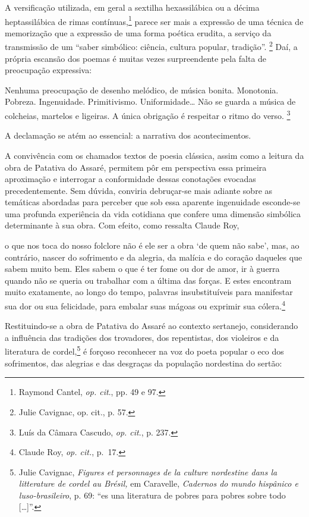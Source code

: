 \noindent A versificação utilizada, em geral a sextilha
hexassilábica ou a décima heptassilábica de rimas contínuas,\footnote{ Raymond
Cantel, \textit{op. cit}., pp. 49 e 97.} parece ser mais a expressão de uma
técnica de memorização que a expressão de uma forma poética erudita, a serviço
da transmissão de um “saber simbólico: ciência, cultura popular, tradição”.
\footnote{ Julie Cavignac, op. cit., p. 57.} Daí, a própria escansão dos
poemas é muitas vezes surpreendente pela falta de preocupação expressiva:

\begin{hedraquote}
Nenhuma preocupação de desenho melódico, de música bonita. Monotonia. Pobreza.
Ingenuidade. Primitivismo. Uniformidade\ldots{} Não se guarda a música de
colcheias, martelos e ligeiras. A única obrigação é respeitar o ritmo do verso.
\footnote{ Luís da Câmara Cascudo, \textit{op. cit}., p. 237.}
\end{hedraquote}

\noindent A declamação se
atém ao essencial: a narrativa dos acontecimentos.

A convivência com os chamados textos de poesia clássica, assim como a leitura da
obra de Patativa do Assaré, permitem pôr em perspectiva essa primeira aproximação
e interrogar a conformidade dessas conotações evocadas precedentemente. Sem
dúvida, conviria debruçar-se mais adiante sobre as temáticas abordadas para
perceber que sob essa aparente ingenuidade esconde-se uma profunda experiência
da vida cotidiana que confere uma dimensão simbólica determinante à sua obra.
Com efeito, como ressalta Claude Roy, 

\begin{hedraquote}
o que nos toca do nosso folclore não é
ele ser a obra ‘de quem não sabe’, mas, ao contrário, nascer do sofrimento e da
alegria, da malícia e do coração daqueles que sabem muito bem. Eles sabem o que
é ter fome ou dor de amor, ir à guerra quando não se queria ou trabalhar com a
última das forças. E estes encontram muito exatamente, ao longo do tempo,
palavras insubstituíveis para manifestar sua dor ou sua felicidade, para embalar
suas mágoas ou exprimir sua cólera.\footnote{ Claude Roy, \textit{op. cit.}, p.~17.}
\end{hedraquote}

\noindent Restituindo-se a obra de Patativa do Assaré ao contexto sertanejo,
considerando a influência das tradições dos trovadores, dos repentistas, dos
violeiros e da literatura de cordel,\footnote{ Julie Cavignac, \textit{Figures et
personnages de la culture nordestine dans la litterature de cordel au
Brésil,} em Caravelle, \textit{Cadernos do mundo hispânico e luso-brasileiro},
p. 69: “es una literatura de pobres para pobres sobre todo [\ldots{}]”.} é
forçoso reconhecer na voz do poeta popular o eco dos sofrimentos, das alegrias e
das desgraças da população nordestina do sertão:

